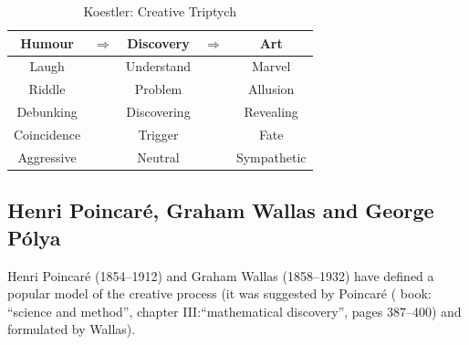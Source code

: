 
\begin{table}[htbp]
  \centering
  \begin{tabu}{ccccc}
  \toprule
  \textbf{Humour}
  &
  $\Rightarrow$
  &
  \textbf{Discovery}
  &
  $\Rightarrow$
  &
  \textbf{Art}
  \\
  \midrule
  Laugh           && Understand         && Marvel       \\
  Riddle          && Problem            && Allusion     \\
  Debunking       && Discovering        && Revealing    \\
  Coincidence     && Trigger            && Fate         \\
  Aggressive      && Neutral            && Sympathetic  \\
  \bottomrule
  \end{tabu}
\caption[Creative Triptych]{Koestler: Creative Triptych}
\label{KHDA}
\end{table}


\subsection{Henri Poincaré, Graham Wallas and George Pólya}

Henri Poincaré (1854--1912) \citep{Poincare2001} and Graham Wallas (1858--1932) \citep{Wallas1926} have defined a popular model \citep{Boden2003, Koestler1964, Partridge1994} of the creative process (it was suggested by Poincaré  (\citep{Poincare2001} book: ``science and method'', chapter III:\@``mathematical discovery'', pages 387--400) and formulated by Wallas).

